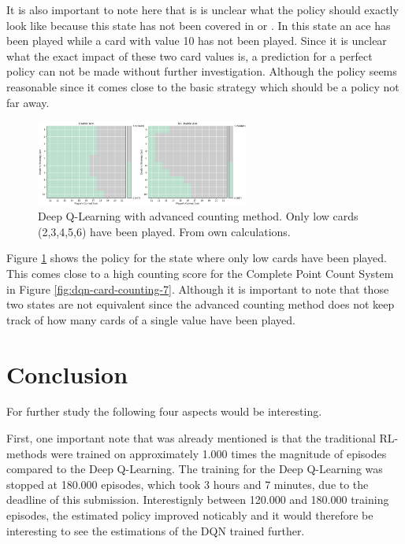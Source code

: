 \documentclass[conference]{IEEEtran}
\begin{document}
It is also important to note here that is is unclear what the policy should exactly look like because this state has not been covered in \cite{b1} or \cite{b4}.
In this state an ace has been played while a card with value 10 has not been played. 
Since it is unclear what the exact impact of these two card values is, a prediction for a perfect policy can not be made without further investigation. 
Although the policy seems reasonable since it comes close to the basic strategy \cite{b1} which should be a policy not far away.

\begin{figure}
	\centering
	\includegraphics[width=70mm]{figures/DQN/advanced/policy-low-cards-played.png}
	\caption{Deep Q-Learning with advanced counting method. Only low cards (2,3,4,5,6) have been played. From own calculations.}
	\label{fig:dqn-advanced-only-low}
\end{figure}

Figure \ref{fig:dqn-advanced-only-low} shows the policy for the state where only low cards have been played. 
This comes close to a high counting score for the Complete Point Count System in Figure \ref{fig:dqn-card-counting-7}.
Although it is important to note that those two states are not equivalent since the advanced counting method does not keep track of how many cards of a single value have been played.



\section{Conclusion}
For further study the following four aspects would be interesting. 

First, one important note that was already mentioned is that the traditional RL-methods were trained on approximately 1.000 times the magnitude of episodes compared to the Deep Q-Learning.
The training for the Deep Q-Learning was stopped at 180.000 episodes, which took 3 hours and 7 minutes, due to the deadline of this submission.
Interestignly between 120.000 and 180.000 training episodes, the estimated policy improved noticably and it would therefore be interesting to see the estimations of the DQN trained further. 
\end{document}
